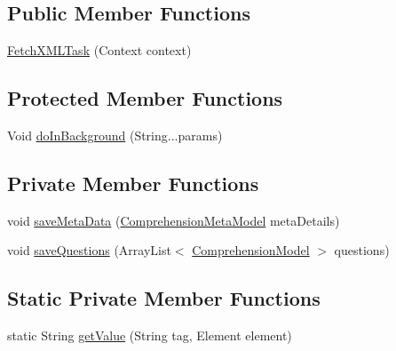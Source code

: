 \subsection*{Public Member Functions}
\begin{DoxyCompactItemize}
\item 
\hyperlink{classorg_1_1buildmlearn_1_1toolkit_1_1comprehensiontemplate_1_1data_1_1FetchXMLTask_a2da329b05c56c01d46230b565785233c}{Fetch\+X\+M\+L\+Task} (Context context)
\end{DoxyCompactItemize}
\subsection*{Protected Member Functions}
\begin{DoxyCompactItemize}
\item 
Void \hyperlink{classorg_1_1buildmlearn_1_1toolkit_1_1comprehensiontemplate_1_1data_1_1FetchXMLTask_aef6f0ea44d16cf5d2fb6efdee87b8ab8}{do\+In\+Background} (String...\+params)
\end{DoxyCompactItemize}
\subsection*{Private Member Functions}
\begin{DoxyCompactItemize}
\item 
void \hyperlink{classorg_1_1buildmlearn_1_1toolkit_1_1comprehensiontemplate_1_1data_1_1FetchXMLTask_acd5067100dcf6f8385a9b2d5f836f03b}{save\+Meta\+Data} (\hyperlink{classorg_1_1buildmlearn_1_1toolkit_1_1templates_1_1ComprehensionMetaModel}{Comprehension\+Meta\+Model} meta\+Details)
\item 
void \hyperlink{classorg_1_1buildmlearn_1_1toolkit_1_1comprehensiontemplate_1_1data_1_1FetchXMLTask_a74a42b3cf27e267a65529a9f2900f4ea}{save\+Questions} (Array\+List$<$ \hyperlink{classorg_1_1buildmlearn_1_1toolkit_1_1templates_1_1ComprehensionModel}{Comprehension\+Model} $>$ questions)
\end{DoxyCompactItemize}
\subsection*{Static Private Member Functions}
\begin{DoxyCompactItemize}
\item 
static String \hyperlink{classorg_1_1buildmlearn_1_1toolkit_1_1comprehensiontemplate_1_1data_1_1FetchXMLTask_a2c224654f14a2e955971a3543833b442}{get\+Value} (String tag, Element element)
\end{DoxyCompactItemize}
